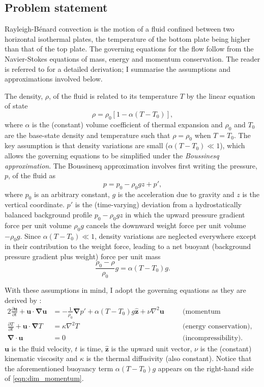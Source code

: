 \documentclass[titlepage,twoside]{article}
\numberwithin{equation}{section}
\newcommand{\pdiff}[2]{\frac{\partial #1}{\partial #2}}
\renewcommand\vec{\bm}
\newcommand{\uvec}[1]{\vec{\hat{#1}}}
\newcommand{\grad}{\vec{\nabla}}
\newcommand{\rb}{Rayleigh-B\'{e}nard}
\begin{document}
\subsection{Problem statement}
\rb{} convection is the motion of a fluid confined between two
horizontal isothermal plates, the temperature of the bottom plate being
higher than that of the top plate. The governing equations for the flow
follow from the Navier-Stokes equations of mass, energy and momentum
conservation. The reader is referred to \textcite{chandrasekhar1961} for
a detailed derivation; I summarise the assumptions and approximations
involved below.

The density, $\rho$, of the fluid is related to its temperature $T$ by
the linear equation of state
\[
    \rho = \rho_0 [1 - \alpha(T - T_0)],
\]
where $\alpha$ is the (constant) volume coefficient of thermal expansion and
$\rho_0$ and $T_0$ are the base-state density and temperature such that $\rho =
\rho_0$ when $T = T_0$. The key assumption is that density variations are small
($\alpha (T - T_0) \ll 1$), which allows the governing equations to be
simplified under the \emph{Boussinesq approximation}. The Boussinesq
approximation involves first writing the pressure, $p$, of the fluid as
\[
    p = p_0 - \rho_0 gz + p',
\]
where $p_0$ is an arbitrary constant, $g$ is the acceleration due to gravity
and $z$ is the vertical coordinate. $p'$ is the (time-varying) deviation from
a hydrostatically balanced background profile $p_0 - \rho_0 gz$
in which the upward pressure gradient force per unit volume $\rho_0 g$ cancels
the downward weight force per unit volume $-\rho_0 g$. Since
$\alpha (T - T_0) \ll 1$, density variations are neglected everywhere except
in their contribution to the weight force, leading to a net buoyant
(background pressure gradient plus weight) force per unit mass
\[
    \frac{\rho_0 - \rho}{\rho_0} g = \alpha (T - T_0) g.
\]

With these assumptions in mind, I adopt the governing equations as they
are derived by \textcite{chandrasekhar1961}:
\begin{alignat}{2}
    \label{eqn:dim_momentum}
    \pdiff{\vec{u}}{t} + \vec{u} \cdot \grad \vec{u}
        &= -\frac{1}{\rho_0} \grad p' + \alpha (T - T_0) g \uvec{z}
        + \nu \nabla^2 \vec{u}
    &\quad& \text{(momentum conservation),} \\
    \label{eqn:dim_energy}
    \pdiff{T}{t} + \vec{u} \cdot \grad T
        &= \kappa \nabla^2 T
    && \text{(energy conservation), and} \\
    \label{eqn:dim_incompressible}
    \grad \cdot \vec{u} &= 0
    && \text{(incompressibility).}
\end{alignat}
$\vec{u}$ is the fluid velocity, $t$ is time, $\uvec{z}$ is the upward
unit vector, $\nu$ is the (constant) kinematic viscosity and $\kappa$ is
the thermal diffusivity (also constant). Notice that the aforementioned
buoyancy term $\alpha (T - T_0) g$ appears on the right-hand side of
\cref{eqn:dim_momentum}.
\end{document}
